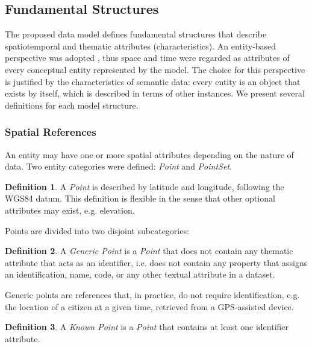 \documentclass[]{interact}
\theoremstyle{plain}%
\theoremstyle{definition}
\theoremstyle{remark}
\theoremstyle{definition}
\newtheorem{defn}{Definition}[section]
\begin{document}
\subsection{Fundamental Structures}\label{sec:fundamental_structures}

The proposed data model defines fundamental structures that describe spatiotemporal and thematic attributes (characteristics). An entity-based perspective was adopted \citep{EDA}, thus space and time were regarded as attributes of every conceptual entity represented by the model. The choice for this perspective is justified by the characteristics of semantic data: every entity is an object that exists by itself, which is described in terms of other instances. We present several definitions for each model structure.

\subsubsection{Spatial References}\label{sec:spatialreferences}

An entity may have one or more spatial attributes depending on the nature of data. Two entity categories were defined: \emph{Point} and \emph{PointSet}.

\begin{defn}
A \emph{Point} is described by latitude and longitude, following the WGS84 datum. This definition is flexible in the sense that other optional attributes may exist, e.g. elevation.
\end{defn}

\noindent Points are divided into two disjoint subcategories:

\begin{defn}\label{dfn:genericpoint}
A \emph{Generic Point} is a \emph{Point} that does not contain any thematic attribute that acts as an identifier, i.e. does not contain any property that assigns an identification, name, code, or any other textual attribute in a dataset.
\end{defn}

\noindent Generic points are references that, in practice, do not require identification, e.g. the location of a citizen at a given time, retrieved from a GPS-assisted device.

\begin{defn}\label{dfn:knownpoint}
A \emph{Known Point} is a \emph{Point} that contains at least one identifier attribute.
\end{defn}
\end{document}
